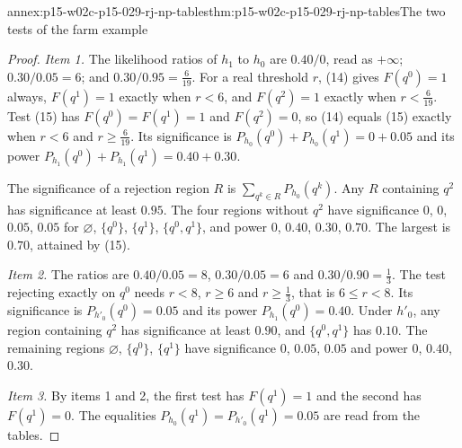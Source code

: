\begin{annexitem}{annex:p15-w02c-p15-029-rj-np-tables}{thm:p15-w02c-p15-029-rj-np-tables}{The two tests of the farm example}
\begin{proof}
\emph{Item 1.} The likelihood ratios of \(h_1\) to \(h_0\) are
\(0.40/0\), read as \(+\infty\); \(0.30/0.05=6\); and
\(0.30/0.95=\tfrac6{19}\). For a real threshold \(r\), (14) gives
\(F(q^0)=1\) always, \(F(q^1)=1\) exactly when \(r<6\), and
\(F(q^2)=1\) exactly when \(r<\tfrac6{19}\). Test (15) has
\(F(q^0)=F(q^1)=1\) and \(F(q^2)=0\), so (14) equals (15) exactly when
\(r<6\) and \(r\ge\tfrac6{19}\). Its significance is
\(P_{h_0}(q^0)+P_{h_0}(q^1)=0+0.05\) and its power
\(P_{h_1}(q^0)+P_{h_1}(q^1)=0.40+0.30\).

The significance of a rejection region \(R\) is
\(\sum_{q^k\in R}P_{h_0}(q^k)\). Any \(R\) containing \(q^2\) has
significance at least \(0.95\). The four regions without \(q^2\) have
significance \(0\), \(0\), \(0.05\), \(0.05\) for \(\varnothing\),
\(\{q^0\}\), \(\{q^1\}\), \(\{q^0,q^1\}\), and power \(0\), \(0.40\),
\(0.30\), \(0.70\). The largest is \(0.70\), attained by (15).

\emph{Item 2.} The ratios are \(0.40/0.05=8\), \(0.30/0.05=6\) and
\(0.30/0.90=\tfrac13\). The test rejecting exactly on \(q^0\) needs
\(r<8\), \(r\ge6\) and \(r\ge\tfrac13\), that is \(6\le r<8\). Its
significance is \(P_{h'_0}(q^0)=0.05\) and its power
\(P_{h_1}(q^0)=0.40\). Under \(h'_0\), any region containing \(q^2\) has
significance at least \(0.90\), and \(\{q^0,q^1\}\) has \(0.10\). The
remaining regions \(\varnothing\), \(\{q^0\}\), \(\{q^1\}\) have
significance \(0\), \(0.05\), \(0.05\) and power \(0\), \(0.40\),
\(0.30\).

\emph{Item 3.} By items 1 and 2, the first test has \(F(q^1)=1\) and the
second has \(F(q^1)=0\). The equalities
\(P_{h_0}(q^1)=P_{h'_0}(q^1)=0.05\) are read from the tables.
\end{proof}
\end{annexitem}

